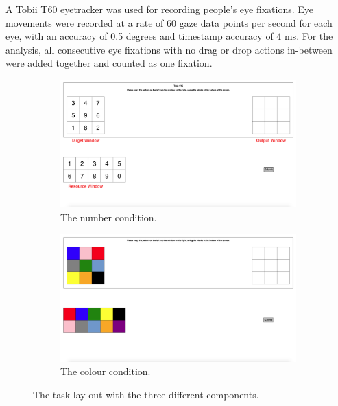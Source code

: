 A Tobii T60 eyetracker was used for recording people's eye fixations. Eye movements were recorded at a rate of 60 gaze data points per second for each eye, with an accuracy of 0.5 degrees and timestamp accuracy of 4 ms. For the analysis, all consecutive eye fixations with no drag or drop actions in-between were added together and counted as one fixation.

\begin{figure}[]
\begin{center}

\begin{subfigure}[b]{\textwidth}
\centerline{\includegraphics[scale=0.23]{images/ch34/ch4_numbers.png}}
\caption{The number condition.}
\label{fig:ch4_BWT}
\end{subfigure}
\begin{subfigure}[b]{0.5\textwidth}
\centerline{\includegraphics[scale=0.23]{images/ch34/ch4_colours.png}}
\caption{The colour condition.}
\label{fig:ch4_NWT}
\end{subfigure}
\caption[Study 3 task lay-out]{The task lay-out with the three different components.}
\label{fig:ch4_taskparadigm}
\end{center}
\end{figure}

